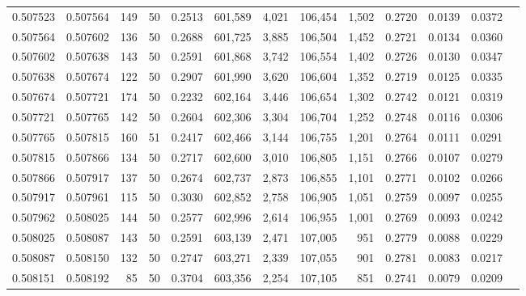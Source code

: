 \begin{tabular}{rrrrrrrrrrrrr}
0.507523 & 0.507564 & 149 &  50 &                                     0.2513 & 601,589 &   4,021 & 106,454 &   1,502 & 0.2720 & 0.0139 & 0.0372 \\
0.507564 & 0.507602 & 136 &  50 &                                     0.2688 & 601,725 &   3,885 & 106,504 &   1,452 & 0.2721 & 0.0134 & 0.0360 \\
0.507602 & 0.507638 & 143 &  50 &                                     0.2591 & 601,868 &   3,742 & 106,554 &   1,402 & 0.2726 & 0.0130 & 0.0347 \\
0.507638 & 0.507674 & 122 &  50 &                                     0.2907 & 601,990 &   3,620 & 106,604 &   1,352 & 0.2719 & 0.0125 & 0.0335 \\
0.507674 & 0.507721 & 174 &  50 &                                     0.2232 & 602,164 &   3,446 & 106,654 &   1,302 & 0.2742 & 0.0121 & 0.0319 \\
0.507721 & 0.507765 & 142 &  50 &                                     0.2604 & 602,306 &   3,304 & 106,704 &   1,252 & 0.2748 & 0.0116 & 0.0306 \\
0.507765 & 0.507815 & 160 &  51 &                                     0.2417 & 602,466 &   3,144 & 106,755 &   1,201 & 0.2764 & 0.0111 & 0.0291 \\
0.507815 & 0.507866 & 134 &  50 &                                     0.2717 & 602,600 &   3,010 & 106,805 &   1,151 & 0.2766 & 0.0107 & 0.0279 \\
0.507866 & 0.507917 & 137 &  50 &                                     0.2674 & 602,737 &   2,873 & 106,855 &   1,101 & 0.2771 & 0.0102 & 0.0266 \\
0.507917 & 0.507961 & 115 &  50 &                                     0.3030 & 602,852 &   2,758 & 106,905 &   1,051 & 0.2759 & 0.0097 & 0.0255 \\
0.507962 & 0.508025 & 144 &  50 &                                     0.2577 & 602,996 &   2,614 & 106,955 &   1,001 & 0.2769 & 0.0093 & 0.0242 \\
0.508025 & 0.508087 & 143 &  50 &                                     0.2591 & 603,139 &   2,471 & 107,005 &     951 & 0.2779 & 0.0088 & 0.0229 \\
0.508087 & 0.508150 & 132 &  50 &                                     0.2747 & 603,271 &   2,339 & 107,055 &     901 & 0.2781 & 0.0083 & 0.0217 \\
0.508151 & 0.508192 &  85 &  50 &                                     0.3704 & 603,356 &   2,254 & 107,105 &     851 & 0.2741 & 0.0079 & 0.0209 \\

\end{tabular}
